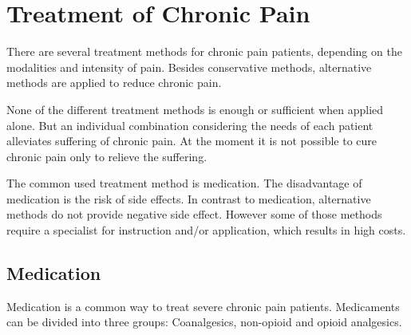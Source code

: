 

\section{Treatment of Chronic Pain} \label{sec:treatment}
There are several treatment methods for chronic pain patients, depending on the modalities and intensity of pain. Besides conservative methods, alternative methods are applied to reduce chronic pain. %
\cite{marcus2009,pope2017}

None of the different treatment methods is enough or sufficient when applied alone. But an individual combination considering the needs of each patient alleviates suffering of chronic pain. At the moment it is not possible to cure chronic pain only to relieve the suffering. \cite{marcus2009,pope2017} 

The common used treatment method is medication. The disadvantage of medication is the risk of side effects. In contrast to medication, alternative methods do not provide negative side effect. However some of those methods require a specialist for instruction and/or application, which results in high costs. \cite{marcus2009,pope2017}

\subsection{Medication}
Medication is a common way to treat severe chronic pain patients. %
Medicaments can be divided into three groups: Coanalgesics, non-opioid and opioid analgesics. \cite{marcus2009}

